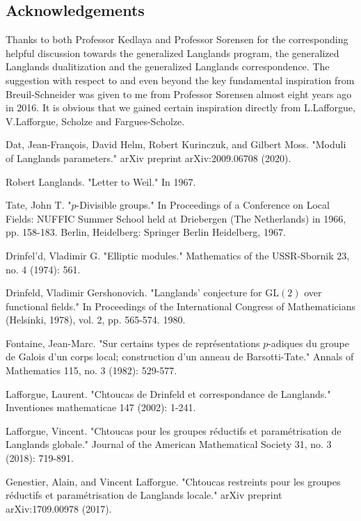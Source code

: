 \documentclass[12pt]{book}
\theoremstyle{definition}
\begin{document}
\newpage
\subsection*{Acknowledgements}
Thanks to both Professor Kedlaya and Professor Sorensen for the corresponding helpful discussion towards the generalized Langlands program, the generalized Langlands dualitization and the generalized Langlands correspondence. The suggestion with respect to and even beyond the key fundamental inspiration from Breuil-Schneider was given to me from Professor Sorensen almost eight years ago in 2016. It is obvious that we gained certain inspiration directly from L.Lafforgue, V.Lafforgue, Scholze and Fargues-Scholze.



\begin{thebibliography}{}
 Dat, Jean-Fran\c{c}ois, David Helm, Robert Kurinczuk, and Gilbert Moss. "Moduli of Langlands parameters." arXiv preprint arXiv:2009.06708 (2020).

 Robert Langlands. "Letter to Weil." In 1967.

 Tate, John T. "$p$-Divisible groups." In Proceedings of a Conference on Local Fields: NUFFIC Summer School held at Driebergen (The Netherlands) in 1966, pp. 158-183. Berlin, Heidelberg: Springer Berlin Heidelberg, 1967. 

 Drinfel'd, Vladimir G. "Elliptic modules." Mathematics of the USSR-Sbornik 23, no. 4 (1974): 561.

 Drinfeld, Vladimir Gershonovich. "Langlands' conjecture for $\mathrm{GL}(2)$ over functional fields." In Proceedings of the International Congress of Mathematicians (Helsinki, 1978), vol. 2, pp. 565-574. 1980. 

 Fontaine, Jean-Marc. "Sur certains types de repr\'esentations $p$-adiques du groupe de Galois d'un corps local; construction d'un anneau de Barsotti-Tate." Annals of Mathematics 115, no. 3 (1982): 529-577.

 Lafforgue, Laurent. "Chtoucas de Drinfeld et correspondance de Langlands." Inventiones mathematicae 147 (2002): 1-241.

 Lafforgue, Vincent. "Chtoucas pour les groupes r\'eductifs et param\'etrisation de Langlands globale." Journal of the American Mathematical Society 31, no. 3 (2018): 719-891.

 Genestier, Alain, and Vincent Lafforgue. "Chtoucas restreints pour les groupes r\'eductifs et param\'etrisation de Langlands locale." arXiv preprint arXiv:1709.00978 (2017).


\end{thebibliography}
\end{document}
